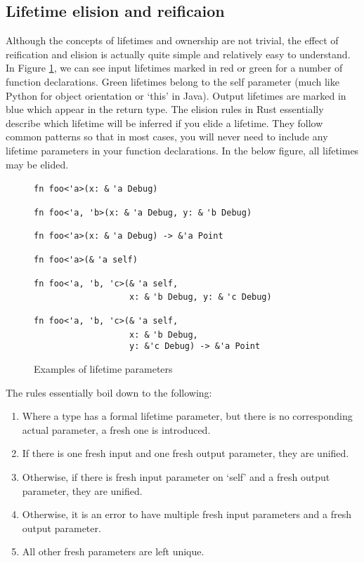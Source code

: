 \subsection{Lifetime elision and reificaion}

Although the concepts of lifetimes and ownership are not trivial, the effect of reification and elision is actually quite simple and relatively easy to understand. In Figure \ref{Fig:lifetimes}, we can see input lifetimes marked in red or green for a number of function declarations. Green lifetimes belong to the self parameter (much like Python for object orientation or `this' in Java). Output lifetimes are marked in blue which appear in the return type. The elision rules in Rust essentially describe which lifetime will be inferred if you elide a lifetime. They follow common patterns so that in most cases, you will never need to include any lifetime parameters in your function declarations. In the below figure, all lifetimes may be elided.

\begin{figure}
{\verb|fn foo<'a>(x: &|}
{\color{red} \verb|'a|}{\verb| Debug)|}

{\verb|fn foo<'a, 'b>(x: &|}
{\color{red} \verb|'a|}{\verb| Debug, y: &|}{\color{red} \verb|'b|}{\verb| Debug)|}

{\verb|fn foo<'a>(x: &|}
{\color{red} \verb|'a|}{\verb| Debug) -> &|}{\color{blue}\verb|'a|}{\verb| Point|}

{\verb|fn foo<'a>(&|}
{\color{green} \verb|'a|}{\verb| self)|}

{\verb|fn foo<'a, 'b, 'c>(&|}{\color{green} \verb|'a|}{\verb| self,|}\\
{\verb|                   x: &|}{\color{red} \verb|'b|}{\verb| Debug, y: &|}{\color{red} \verb|'c|}{\verb| Debug)|}

{\verb|fn foo<'a, 'b, 'c>(&|}{\color{green} \verb|'a|}{\verb| self,|}\\
{\verb|                   x: &|}{\color{red} \verb|'b|}{\verb| Debug,|}\\
{\verb|                   y: &|}{\color{red}\verb|'c|}{\verb| Debug) -> &|}{\color{blue}\verb|'a|}{\verb| Point|}

\caption{Examples of lifetime parameters}
\label{Fig:lifetimes}
\end{figure}

The rules essentially boil down to the following:
\begin{enumerate}
\item Where a type has a formal lifetime parameter, but there is no corresponding actual parameter, a fresh one is introduced.
\item If there is one fresh input and one fresh output parameter, they are unified.
\item Otherwise, if there is fresh input parameter on `self' and a fresh output parameter, they are unified.
\item Otherwise, it is an error to have multiple fresh input parameters and a fresh output parameter.
\item All other fresh parameters are left unique.
\end{enumerate}

